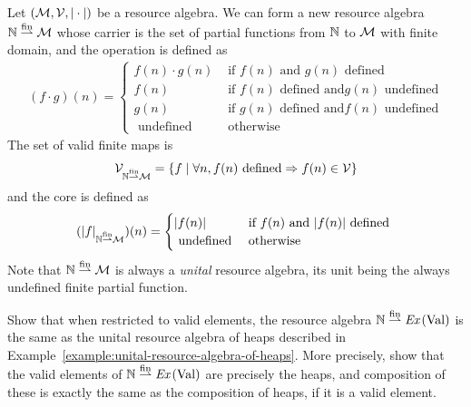\begin{example}
  Let $(\mathcal{M}, \mathcal{V}, {\mid}\cdot{\mid})$ be a resource algebra.
  We can form a new resource algebra $\mathbb{N} \overset{\text{fin}}{\rightharpoonup} \mathcal{M}$ whose carrier is the set of partial functions from $\mathbb{N}$ to $\mathcal{M}$ with finite domain, and the operation is defined as
  \begin{align*}
    (f \cdot g)(n) =
    \begin{cases}
      f(n) \cdot g(n) & \text{ if } f(n) \text{ and } g(n) \text{ defined}\\
      f(n) & \text{ if } f(n) \text{ defined and} g(n) \text{ undefined}\\
      g(n) & \text{ if } g(n) \text{ defined and} f(n) \text{ undefined}\\
      \text{ undefined} & \text{ otherwise}
    \end{cases}
  \end{align*}
  The set of valid finite maps is
  \begin{align*}
    \Vl_{\NN \finparmap \Ml} = \left\{f \isetsep \forall n, f(n) \text{ defined} \implies f(n) \in \Vl\right\}
  \end{align*}
  and the core is defined as
  \begin{align*}
    ({\mid}f{\mid}_{\mathbb{N} \overset{\text{fin}}{\rightharpoonup} \mathcal{M}})(n) =
    \begin{cases}
      {\mid}f(n){\mid} & \text{ if } f(n) \text{ and } {\mid}f(n){\mid} \text{ defined }\\
      \text{ undefined} & \text{ otherwise }
    \end{cases}
  \end{align*}
  Note that $\mathbb{N} \overset{\text{fin}}{\rightharpoonup} \mathcal{M}$ is always a \emph{unital} resource algebra, its unit being the always undefined finite partial function.
\end{example}

\begin{exercise}
  Show that when restricted to valid elements, the resource algebra $\mathbb{N} \overset{\text{fin}}{\rightharpoonup} \textit{Ex}\left(\text{Val}\right)$ is the same as the unital resource algebra of heaps described in Example~\ref{example:unital-resource-algebra-of-heaps}.
  More precisely, show that the valid elements of $\mathbb{N} \overset{\text{fin}}{\rightharpoonup} \textit{Ex}\left(\text{Val}\right)$ are precisely the heaps, and composition of these is exactly the same as the composition of heaps, if it is a valid element.
\end{exercise}


